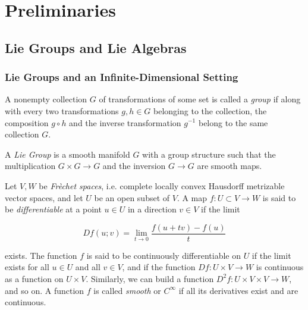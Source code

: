 



\section{Preliminaries}
\subsection{Lie Groups and Lie Algebras}
\subsubsection{Lie Groups and an Infinite-Dimensional Setting}


\begin{defn}

	A nonempty collection $G$ of transformations of some set is called a \textit{group} if along with every two transformations $g,h \in G$ belonging to the collection, the composition $g \circ h$ and the inverse transformation $g^{-1}$ belong to the same collection $G$.

\end{defn}


\begin{defn}

A \textit{Lie Group} is a smooth manifold $G$ with a group structure such that the multiplication $G \times G \to G$ and the inversion $G \to G$ are smooth maps.

\end{defn}


\begin{defn}

Let $V,W$ be \textit{Fr\`echet spaces}, i.e. complete locally convex Hausdorff metrizable vector spaces, and let $U$ be an open subset of $V$. A map $f: U \subset V \to W$ is said to be \textit{differentiable} at a point $u \in U$ in a direction $v \in V$ if the limit


\begin{equation}
Df(u;v) = \lim_{t \to 0} \frac{f(u+tv)-f(u)}{t}
\end{equation}

exists. The function $f$ is said to be continuously differentiable on $U$ if the limit exists for all $u \in U$ and all $v \in V$, and if the function $Df:U \times V \to W$ is continuous as a function on $U \times V$. Similarly, we can build a function $D^2 f: U \times V \times V \to W$, and so on. A function $f$ is called \textit{smooth} or $C^{\infty}$ if all its derivatives exist and are continuous.
\end{defn}


